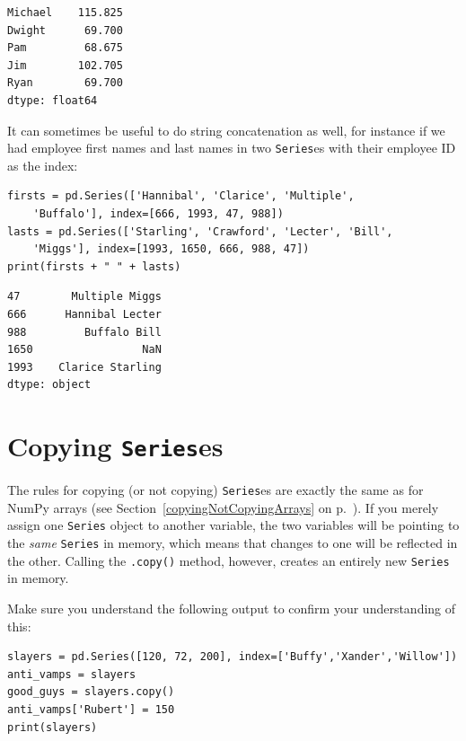 \begin{Verbatim}[fontsize=\small,samepage=true,frame=leftline,framesep=5mm,framerule=1mm]
Michael    115.825
Dwight      69.700
Pam         68.675
Jim        102.705
Ryan        69.700
dtype: float64
\end{Verbatim}

It can sometimes be useful to do string concatenation as well, for instance if
we had employee first names and last names in two \texttt{Series}es with their
employee ID as the index:

\begin{Verbatim}[fontsize=\footnotesize,samepage=true,frame=single,framesep=3mm]
firsts = pd.Series(['Hannibal', 'Clarice', 'Multiple',
    'Buffalo'], index=[666, 1993, 47, 988])
lasts = pd.Series(['Starling', 'Crawford', 'Lecter', 'Bill',
    'Miggs'], index=[1993, 1650, 666, 988, 47])
print(firsts + " " + lasts)
\end{Verbatim}

\begin{Verbatim}[fontsize=\small,samepage=true,frame=leftline,framesep=5mm,framerule=1mm]
47        Multiple Miggs
666      Hannibal Lecter
988         Buffalo Bill
1650                 NaN
1993    Clarice Starling
dtype: object
\end{Verbatim}

\section{Copying \texttt{Series}es}

The rules for copying (or not copying) \texttt{Series}es are exactly the same
as for NumPy arrays (see Section~\ref{copyingNotCopyingArrays} on
p.~\pageref{copyingNotCopyingArrays}). If you merely assign one \texttt{Series}
object to another variable, the two variables will be pointing to the
\textit{same} \texttt{Series} in memory, which means that changes to one will
be reflected in the other. Calling the \texttt{.copy()} method, however,
creates an entirely new \texttt{Series} in memory.

Make sure you understand the following output to confirm your understanding of
this:


\begin{Verbatim}[fontsize=\CBCodeSmall,samepage=true,frame=single,framesep=3mm]
slayers = pd.Series([120, 72, 200], index=['Buffy','Xander','Willow'])
anti_vamps = slayers
good_guys = slayers.copy()
anti_vamps['Rubert'] = 150
print(slayers)
\end{Verbatim}
\vspace{-.3in}

